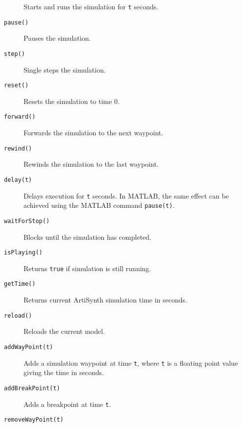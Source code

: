 \documentclass{article}
\begin{document}
\begin{description}
Starts and runs the simulation for {\tt t} seconds.

\item[{\tt pause()}] \mbox{}

Pauses the simulation.

\item[{\tt step()}] \mbox{}

Single steps the simulation.

\item[{\tt reset()}] \mbox{}

Resets the simulation to time 0.

\item[{\tt forward()}] \mbox{}

Forwards the simulation to the next waypoint.

\item[{\tt rewind()}] \mbox{}

Rewinds the simulation to the last waypoint.

\item[{\tt delay(t)}] \mbox{}

Delays execution for {\tt t} seconds. In MATLAB, the same effect can
be achieved using the MATLAB command {\tt pause(t)}.

\item[{\tt waitForStop()}] \mbox{}

Blocks until the simulation has completed.

\item[{\tt isPlaying()}] \mbox{}

Returns {\tt true} if simulation is still running.

\item[{\tt getTime()}] \mbox{}

Returns current ArtiSynth simulation time in seconds.

\item[{\tt reload()}] \mbox{}

Reloads the current model.

\item[{\tt addWayPoint(t)}] \mbox{}

Adds a simulation waypoint at time {\tt t},
where {\tt t} is a floating point value giving
the time in seconds.

\item[{\tt addBreakPoint(t)}] \mbox{}

Adds a breakpoint at time {\tt t}.

\item[{\tt removeWayPoint(t)}] \mbox{}


\end{description}
\end{document}
